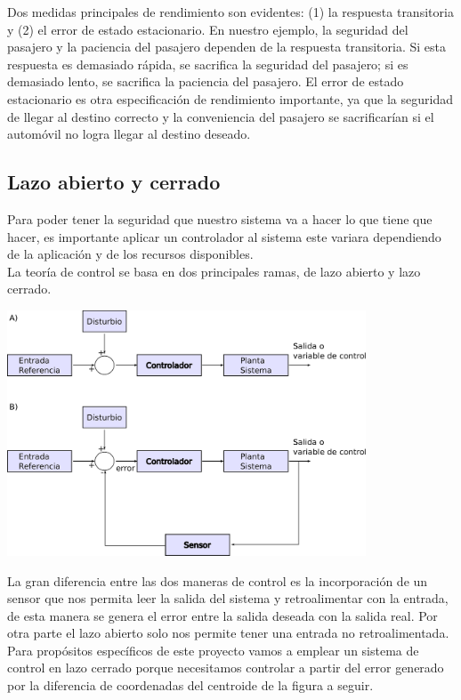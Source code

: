 Dos medidas principales de rendimiento son evidentes: (1) la respuesta transitoria y (2) el error
de estado estacionario. En nuestro ejemplo, la seguridad del pasajero y la paciencia del pasajero
dependen de la respuesta transitoria. Si esta respuesta es demasiado rápida, se sacrifica la
seguridad del pasajero; si es demasiado lento, se sacrifica la paciencia del pasajero.
El error de estado estacionario es otra especificación de rendimiento importante, ya que la seguridad
de llegar al destino correcto y la conveniencia del pasajero se sacrificarían si el automóvil no
logra llegar al destino deseado.


\subsection{Lazo abierto y cerrado}
Para poder tener la seguridad que nuestro sistema va a hacer lo que tiene que hacer, es importante
aplicar un controlador al sistema este variara dependiendo de la aplicación y de los recursos
disponibles.\\
La teoría de control se basa en dos principales ramas, de lazo abierto y lazo cerrado.
\begin{center}
	\includegraphics[width=0.8\textwidth]{Contenido/Cuerpo/Capitulo2/Fig21.eps}
	\label{fig:MarcoTeorico:Fig25}
\end{center}
La gran diferencia entre las dos maneras de control es la incorporación de un sensor que nos
permita leer la salida del sistema y retroalimentar con la entrada, de esta manera se genera
el error entre la salida deseada con la salida real. Por otra parte el lazo abierto solo nos permite
tener una entrada no retroalimentada.\\
Para propósitos específicos de este proyecto vamos a emplear un sistema de control en lazo cerrado
porque necesitamos controlar a partir del error generado por la diferencia de coordenadas del
centroide de la figura a seguir.

